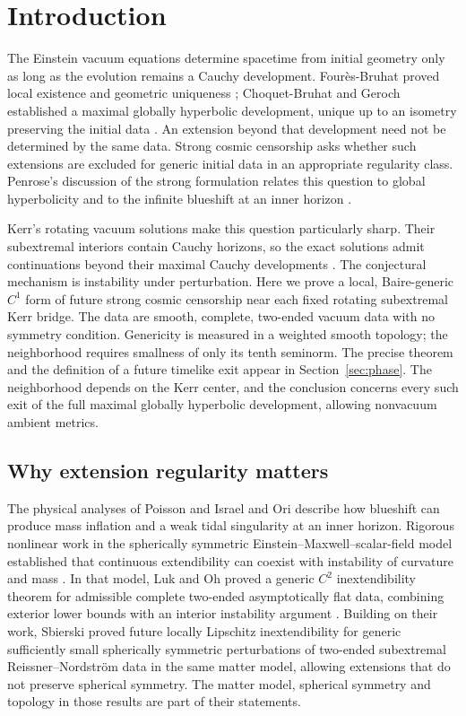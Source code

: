 \section{Introduction}
\label{sec:introduction}

The Einstein vacuum equations determine spacetime from initial geometry
only as long as the evolution remains a Cauchy development. Four\`es-Bruhat
proved local existence and geometric uniqueness \cite{ChoquetBruhat1952};
Choquet-Bruhat and Geroch established a maximal globally hyperbolic
development, unique up to an isometry preserving the initial data
\cite{ChoquetBruhatGeroch1969}. An extension beyond that development need
not be determined by the same data. Strong cosmic censorship asks whether
such extensions are excluded for generic initial data in an appropriate
regularity class. Penrose's discussion of the strong formulation relates
this question to global hyperbolicity and to the infinite blueshift at
an inner horizon \cite[Section~12.3.2]{Penrose1979}.

Kerr's rotating vacuum solutions \cite{Kerr1963} make this question
particularly sharp. Their subextremal interiors contain Cauchy horizons,
so the exact solutions admit continuations beyond their maximal Cauchy
developments \cite{Carter1968}. The conjectural mechanism is instability under perturbation.
Here we prove a local, Baire-generic $C^1$ form of future strong cosmic
censorship near each fixed rotating subextremal Kerr bridge. The data are
smooth, complete, two-ended vacuum data with no symmetry condition.
Genericity is measured in a weighted smooth topology; the neighborhood
requires smallness of only its tenth seminorm. The precise theorem and
the definition of a future timelike exit appear in
Section~\ref{sec:phase}. The neighborhood depends on the Kerr center,
and the conclusion concerns every such exit of the full maximal
globally hyperbolic development, allowing nonvacuum ambient metrics.

\subsection{Why extension regularity matters}

The physical analyses of Poisson and Israel \cite{PoissonIsrael1990}
and Ori \cite{Ori1991,Ori1992} describe how blueshift can produce
mass inflation and a weak tidal singularity at an inner horizon.
Rigorous nonlinear work in the spherically symmetric
Einstein--Maxwell--scalar-field model established that continuous
extendibility can coexist with instability of curvature and mass
\cite{Dafermos2003,Dafermos2005}. In that model, Luk and Oh proved a
generic $C^2$ inextendibility theorem for admissible complete two-ended
asymptotically flat data, combining exterior lower bounds with an
interior instability argument \cite{LukOh2019I,LukOh2019II}.
Building on their work, Sbierski \cite[Theorem~4.31]{Sbierski2022}
proved future locally Lipschitz inextendibility for generic sufficiently
small spherically symmetric perturbations of two-ended subextremal
Reissner--Nordstr\"om data in the same matter model, allowing extensions
that do not preserve spherical symmetry.
The matter model, spherical symmetry and topology in those results
are part of their statements.


